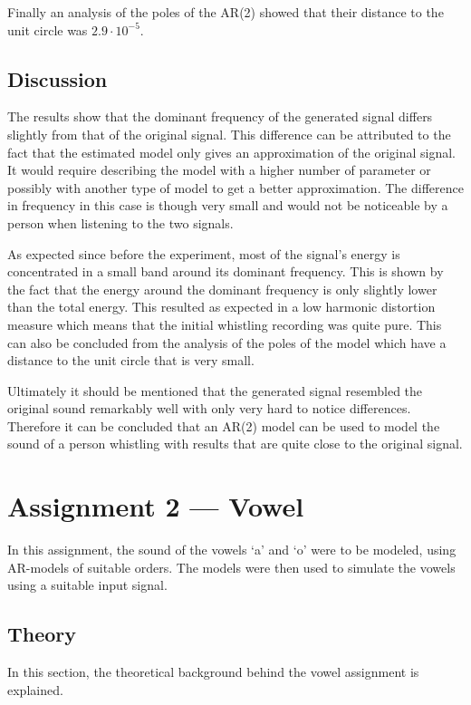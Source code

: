 \documentclass{IEEEtran}
\begin{document}
Finally an analysis of the poles of the AR(2) showed that their distance
to the unit circle was $2.9\cdot10^{-5}$.

\subsection{Discussion}
The results show that the dominant frequency of the generated signal
differs slightly from that of the original signal. This difference can
be attributed to the fact that the estimated model only gives an
approximation of the original signal. It would require describing the
model with a higher number of parameter or possibly with another type
of model to get a better approximation. The difference in frequency
in this case is though very small and would not be noticeable
by a person when listening to the two signals.

As expected since before the experiment, most of the signal's energy
is concentrated in a small band around its dominant frequency. This
is shown by the fact that the energy around the dominant frequency is
only slightly lower than the total energy. This resulted as expected
in a low harmonic distortion measure which means that the initial
whistling recording was quite pure. This can also be concluded from
the analysis of the poles of the model which have a distance to the
unit circle that is very small.

Ultimately it should be mentioned that the generated signal resembled the
original sound remarkably well with only very hard to notice
differences. Therefore it can be concluded that an AR(2) model can
be used to model the sound of a person whistling with results that
are quite close to the original signal.

\section{Assignment 2 --- Vowel}

In this assignment, the sound of the vowels `a' and `o' were to be
modeled, using AR-models of suitable orders. The models were then
used to simulate the vowels using a suitable input signal.

\subsection{Theory}
\label{sub:voweltheory}

In this section, the theoretical background behind the vowel assignment is
explained.
\end{document}
